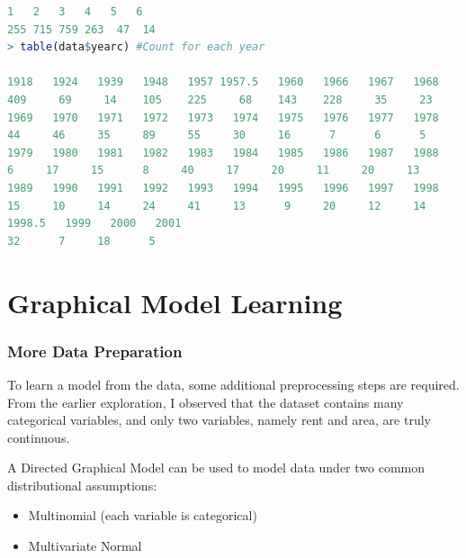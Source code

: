 \documentclass[15pt,a4paper]{report}
\begin{document}
\begin{itemize}
\begin{lstlisting}[language=R]
1   2   3   4   5   6 
255 715 759 263  47  14 
> table(data$yearc) #Count for each year

1918   1924   1939   1948   1957 1957.5   1960   1966   1967   1968 
409     69     14    105    225     68    143    228     35     23 
1969   1970   1971   1972   1973   1974   1975   1976   1977   1978 
44     46     35     89     55     30     16      7      6      5 
1979   1980   1981   1982   1983   1984   1985   1986   1987   1988 
6     17     15      8     40     17     20     11     20     13 
1989   1990   1991   1992   1993   1994   1995   1996   1997   1998 
15     10     14     24     41     13      9     20     12     14 
1998.5   1999   2000   2001 
32      7     18      5 
	\end{lstlisting}
\end{itemize}
\section*{Graphical Model Learning}
\subsubsection*{More Data Preparation}
To learn a model from the data, some additional preprocessing steps are required. From the earlier exploration, I observed that the dataset contains many categorical variables, and only two variables, namely rent and area, are truly continuous. 

A Directed Graphical Model can be used to model data under two common distributional assumptions:
\begin{itemize}
	\item Multinomial (each variable is categorical)
	\item Multivariate Normal
\end{itemize}
\end{document}
